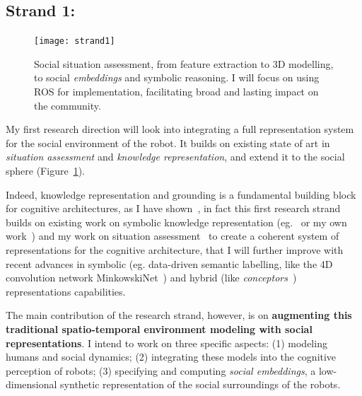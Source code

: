\subsection{Strand 1: \textbf{\wpTwo}}

\begin{figure}[ht!]
    \centering
    \texttt{[image: strand1]}
    \caption{Social situation assessment, from feature extraction to 3D
    modelling, to social \emph{embeddings} and symbolic reasoning. I will focus
    on using ROS for implementation, facilitating broad and lasting impact on
    the community.}
    \label{fig:strand1}
\end{figure}

My first research direction will look into integrating a full representation
system for the social environment of the robot. It builds on existing state of
art in \emph{situation assessment} and \emph{knowledge representation}, and
extend it to the social sphere (Figure~\ref{fig:strand1}).

Indeed, knowledge representation and grounding is a fundamental building block
for cognitive architectures, as I have
shown~\parencite{lemaignan2017artificial}, in fact this first research strand
builds on existing work on symbolic knowledge representation
(eg.~\parencite{tenorth2009knowrob} or my own work~\parencite{lemaignan2010oro})
and my work on situation assessment~\parencite{lemaignan2018underworlds,
sallami2019simulation} to create a coherent system of representations for the
cognitive architecture, that I will further improve with recent advances in symbolic
(eg.  data-driven semantic labelling, like the 4D convolution network
MinkowskiNet~\parencite{choy20194d}) and hybrid (like
\emph{conceptors}~\parencite{jaeger2014controlling}) representations
capabilities.

The main contribution of the research strand, however, is on \textbf{augmenting
this traditional spatio-temporal environment modeling with social
representations}. I intend to work on three specific aspects: (1) modeling humans
and social dynamics; (2) integrating these models into the cognitive perception
of robots; (3) specifying and computing \emph{social embeddings}, a
low-dimensional synthetic representation of the social surroundings of the
robots.

